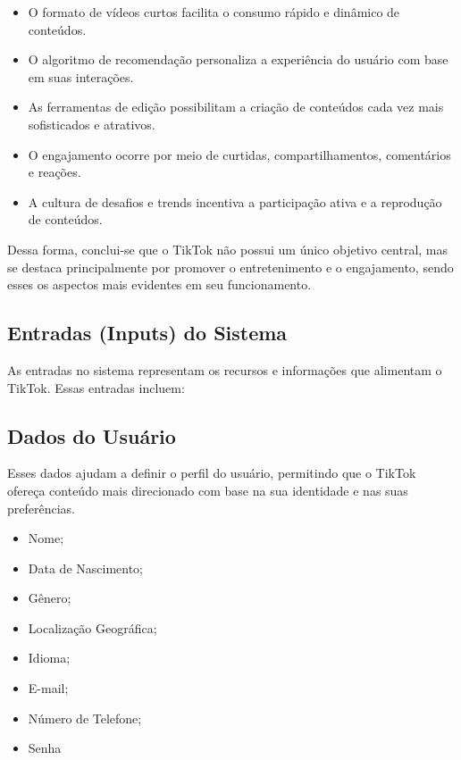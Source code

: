 \begin{itemize}
    \item O formato de vídeos curtos facilita o consumo rápido e dinâmico de conteúdos.
    \item O algoritmo de recomendação personaliza a experiência do usuário com base em suas interações.
    \item As ferramentas de edição possibilitam a criação de conteúdos cada vez mais sofisticados e atrativos.
    \item O engajamento ocorre por meio de curtidas, compartilhamentos, comentários e reações.
     \item A cultura de desafios e trends incentiva a participação ativa e a reprodução de conteúdos.
\end{itemize}


Dessa forma, conclui-se que o TikTok não possui um único objetivo central, mas se destaca principalmente por promover o entretenimento e o engajamento, sendo esses os aspectos mais evidentes em seu funcionamento.

\newpage
\subsection{Entradas (Inputs) do Sistema}

As entradas no sistema representam os recursos e informações que alimentam o TikTok. Essas entradas incluem:


\subsection{Dados do Usuário}

Esses dados ajudam a definir o perfil do usuário, permitindo que o TikTok ofereça conteúdo mais direcionado com base na sua identidade e nas suas preferências. 

\begin{itemize}
    \item Nome;
    \item Data de Nascimento;
    \item Gênero;
    \item Localização Geográfica;
    \item Idioma;
    \item E-mail;
    \item Número de Telefone;
    \item Senha
\end{itemize}



